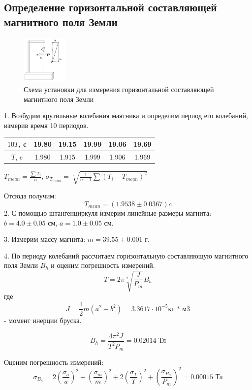 \documentclass[a4paper]{article}
\begin{document}
\subsection{Определение горизонтальной составляющей магнитного поля Земли}
     \begin{figure}[H]
    \centering
    	\includegraphics[width=0.2\textwidth]{1_2_ris5.png}
        \caption{Схема установки для измерения горизонтальной составляющей магнитного поля Земли}
    \end{figure}
	1. Возбудим крутильные колебания маятника и определим период его колебаний, измерив время 10 периодов.
	\begin{tabbing}
    \centering
		\begin{tabular}{|c|c|c|c|c|c|} \hline
        $10 T$, c & 19.80 & 19.15 & 19.99 & 19.06 & 19.69 \\ \hline
        $T$, c & 1.980 & 1.915 & 1.999 & 1.906 & 1.969 \\ \hline 
		\end{tabular}
	\end{tabbing}
    $T_{mean} = \frac{\sum T_{i}}{n}$, $\sigma_{T_{mean}} = \sqrt[2]{\frac{1}{n - 1} \sum(T_{i} - T_{mean})^{2}}$
    
    Отсюда получим:
       	\[ T_{mean} = (1.9538 \pm 0.0367) c\]
	2. С помощью штангенциркуля измерим линейные размеры магнита: 
	$b = 4.0 \pm 0.05$ см,
	$a = 1.0 \pm 0.05 $ см.
    
	3. Измерим массу магнита:
	$m = 39.55 \pm 0.001$ г.

	4. По периоду колебаний рассчитаем горизонтальную составляющую магнитного поля Земли $B_{h}$ и оценим погрешность измерений.
	\[ T = 2 \pi \sqrt[2]{\frac{J}{P_{m}}} B_{h}\]
    где
    \[ J = \frac{1}{2} m(a^{2} + b^{2}) = 3.3617 \cdot 10^{-5} \text{кг * м3}\]
    - момент инерции бруска.
    
   \[ B_{h} = \frac{4 \pi^{2} J}{T^{2} P_{m}} =  0.02014 \text{ Тл}\]
   
   Оценим погрешность измерений:
	\[ \sigma_{B_{h}} = 2 (\frac{\sigma_{a}}{a})^{2} + (\frac{\sigma_{m}}{m})^{2} + 2 (\frac{\sigma_{T}}{T})^{2} + (\frac{\sigma_{P_{m}}}{P_{m}})^{2} =  0.00015  \text{ Тл} \]
\end{document}

